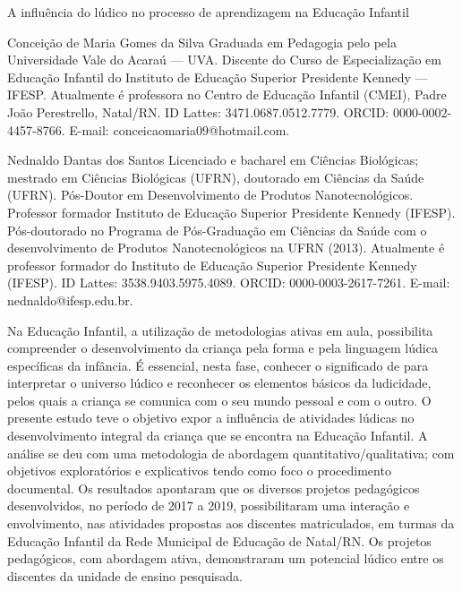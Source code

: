 \begin{refsection}
    \renewcommand{\thefigure}{\arabic{figure}}
    
    \chapterOneLine
    {A influência do lúdico no processo de aprendizagem na Educação Infantil}
    \label{chap:influencia-ludico}

    \articleAuthor
    {Conceição de Maria Gomes da Silva}
    {Graduada em Pedagogia pelo pela Universidade Vale do Acaraú --- UVA. Discente do Curso de Especialização em Educação Infantil do Instituto de Educação Superior Presidente Kennedy --- IFESP. Atualmente é professora no Centro de Educação Infantil (CMEI), Padre João Perestrello, Natal/RN. ID Lattes: 3471.0687.0512.7779. ORCID: 0000-0002-4457-8766. E-mail: conceicaomaria09@hotmail.com.}
    
    \articleAuthor
    {Nednaldo Dantas dos Santos}
    {Licenciado e bacharel em Ciências Biológicas; mestrado em Ciências Biológicas (UFRN), doutorado em Ciências da Saúde (UFRN). Pós-Doutor em Desenvolvimento de Produtos Nanotecnológicos. Professor formador Instituto de Educação Superior Presidente Kennedy (IFESP). Pós-doutorado no Programa de Pós-Graduação em Ciências da Saúde com o desenvolvimento de Produtos Nanotecnológicos na UFRN (2013). Atualmente é professor formador do Instituto de Educação Superior Presidente Kennedy (IFESP). ID Lattes: 3538.9403.5975.4089. ORCID: 0000-0003-2617-7261. E-mail: nednaldo@ifesp.edu.br.}
    
    \begin{galoResumo}
        Na Educação Infantil, a utilização de metodologias ativas em aula, possibilita compreender o desenvolvimento da criança pela forma e pela linguagem lúdica específicas da infância. É essencial, nesta fase, conhecer o significado de para interpretar o universo lúdico e reconhecer os elementos básicos da ludicidade, pelos quais a criança se comunica com o seu mundo pessoal e com o outro. O presente estudo teve o objetivo expor a influência de atividades lúdicas no desenvolvimento integral da criança que se encontra na Educação Infantil. A análise se deu com uma metodologia de abordagem quantitativo/qualitativa; com objetivos exploratórios e explicativos tendo como foco o procedimento documental. Os resultados apontaram que os diversos projetos pedagógicos desenvolvidos, no período de 2017 a 2019, possibilitaram uma interação e envolvimento, nas atividades propostas aos discentes matriculados, em turmas da Educação Infantil da Rede Municipal de Educação de Natal/RN. Os projetos pedagógicos, com abordagem ativa, demonstraram um potencial lúdico entre os discentes da unidade de ensino pesquisada. 
    \end{galoResumo}
    

\end{refsection}
